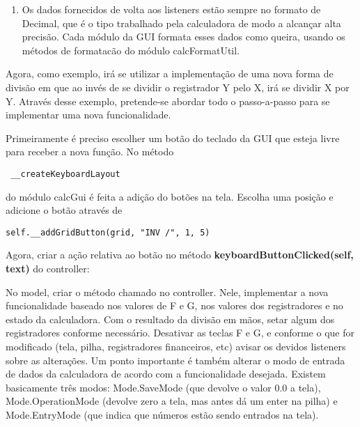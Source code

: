 \begin{enumerate}
\item Os dados fornecidos de volta aos listeners estão sempre no formato de Decimal, que é o tipo trabalhado pela 
calculadora de modo a alcançar alta precisão. Cada módulo da GUI formata esses dados como queira, usando os métodos 
de formatacão do módulo calcFormatUtil.

\end{enumerate}

Agora, como exemplo, irá se utilizar a implementação de uma nova forma de divisão em que ao invés de se dividir o 
registrador Y pelo X, irá se dividir X por Y. Através desse exemplo, pretende-se abordar todo o passo-a-passo para se 
implementar uma nova funcionalidade.

Primeiramente é preciso escolher um botão do teclado da GUI que esteja livre para receber a nova função. 
No método \begin{verbatim} __createKeyboardLayout \end{verbatim}
do módulo calcGui é feita a adição do botões na tela. Escolha uma posição e adicione o 
botão através de \begin{verbatim}self.__addGridButton(grid, "INV /", 1, 5)\end{verbatim}

Agora, criar a ação relativa ao botão no método \textbf{keyboardButtonClicked(self, text)}
do controller: 



No model, criar o método chamado no controller. Nele, implementar a nova funcionalidade baseado nos valores de 
F e G, nos valores dos registradores e no estado da calculadora. Com o resultado da divisão em mãos, setar algum dos 
registradores conforme necessário. Desativar as teclas F e G, e conforme o que for modificado (tela, pilha, registradores 
financeiros, etc) avisar os devidos listeners sobre as alterações. Um ponto importante é também alterar o modo de 
entrada de dados da calculadora de acordo com a funcionalidade desejada. Existem basicamente três modos: 
Mode.SaveMode (que devolve o valor 0.0 a tela), Mode.OperationMode (devolve zero a tela, mas antes dá um enter na pilha) 
e Mode.EntryMode (que indica que números estão sendo entrados na tela).




